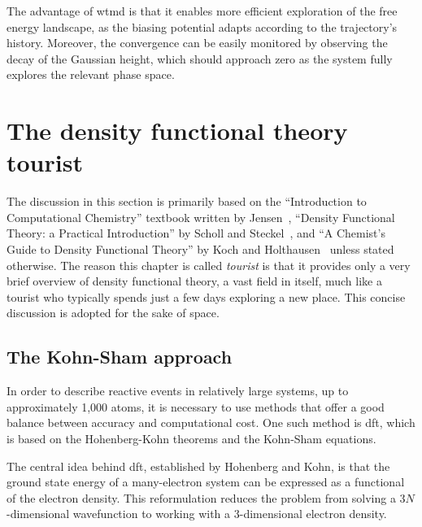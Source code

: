 The advantage of \ac{wtmd} is that it enables more efficient exploration of the free energy landscape, as the biasing potential adapts according to the trajectory's history. Moreover, the convergence can be easily monitored by observing the decay of the Gaussian height, which should approach zero as the system fully explores the relevant phase space.








\section{The density functional theory tourist}
The discussion in this section is primarily based on the ``Introduction to Computational Chemistry'' textbook written by Jensen~\citep{jensenIntroductionComputationalChemistry2017}, ``Density Functional Theory: a Practical Introduction'' by Scholl and Steckel~\citep{shollDensityFunctionalTheory2011}, and ``A Chemist's Guide to Density Functional Theory'' by Koch and Holthausen~\citep{kochChemistsGuideDensity2015} unless stated otherwise. The reason this chapter is called \textit{tourist} is that it provides only a very brief overview of density functional theory, a vast field in itself, much like a tourist who typically spends just a few days exploring a new place. This concise discussion is adopted for the sake of space.

\subsection{The Kohn-Sham approach}
In order to describe reactive events in relatively large systems, up to approximately 1,000 atoms, it is necessary to use methods that offer a good balance between accuracy and computational cost. One such method is \ac{dft}, which is based on the Hohenberg-Kohn theorems and the Kohn-Sham equations.

The central idea behind \ac{dft}, established by Hohenberg and Kohn, is that the ground state energy of a many-electron system can be expressed as a functional of the electron density. This reformulation reduces the problem from solving a 3$N$-dimensional wavefunction to working with a 3-dimensional electron density.

